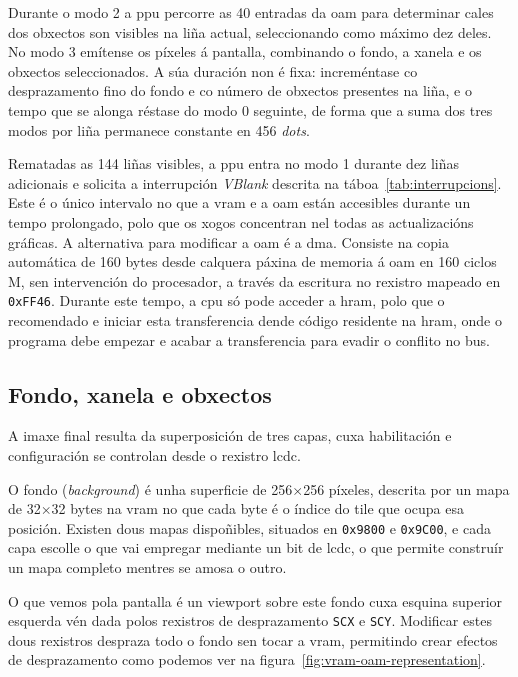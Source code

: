 Durante o modo 2 a \acrshort{ppu} percorre as 40 entradas da \acrshort{oam} para determinar
cales dos obxectos son visibles na liña actual, seleccionando como máximo dez deles.
No modo 3 emítense os píxeles á pantalla, combinando o fondo, a xanela e os obxectos
seleccionados. A súa duración non é fixa: increméntase co desprazamento fino do
fondo e co número de obxectos presentes na liña, e o tempo que se alonga réstase do modo 0
seguinte, de forma que a suma dos tres modos por liña permanece constante en 456 \textit{dots}.

Rematadas as 144 liñas visibles, a \acrshort{ppu} entra no modo 1 durante dez liñas
adicionais e solicita a interrupción \textit{VBlank} descrita na
táboa~\ref{tab:interrupcions}. Este é o único intervalo no que a \acrshort{vram} e a
\acrshort{oam} están accesibles durante un tempo prolongado, polo que os xogos concentran
nel todas as actualizacións gráficas.
A alternativa para modificar a \acrshort{oam} é a \acrfull{dma}.
Consiste na copia automática de 160 bytes desde calquera páxina de memoria
á \acrshort{oam} en 160 ciclos M, sen intervención do procesador, a través da escritura
no rexistro mapeado en \texttt{0xFF46}. Durante este tempo, a \acrshort{cpu} só pode
acceder a \acrshort{hram}, polo que o recomendado e iniciar esta transferencia dende
código residente na \acrshort{hram}, onde o programa debe empezar e acabar a transferencia para evadir
o conflito no bus.

\subsection{Fondo, xanela e obxectos}
\label{subsec:ppu-capas}

A imaxe final resulta da superposición de tres capas, cuxa habilitación e configuración
se controlan desde o rexistro \acrfull{lcdc}.

O fondo (\textit{background}) é unha superficie de 256$\times$256 píxeles, descrita
por un mapa de 32$\times$32 bytes na \acrshort{vram} no que cada byte é o índice do
\gls{tile} que ocupa esa posición. Existen dous mapas dispoñibles, situados en
\texttt{0x9800} e \texttt{0x9C00}, e cada capa escolle o que vai empregar mediante un bit
de \acrshort{lcdc}, o que permite construír un mapa completo mentres se amosa o outro.

O que vemos pola pantalla é un \gls{viewport} sobre este fondo
cuxa esquina superior esquerda vén dada polos rexistros de desprazamento \texttt{SCX} e \texttt{SCY}.
Modificar estes dous rexistros despraza todo o fondo sen tocar
a \acrshort{vram}, permitindo crear efectos de desprazamento como podemos ver
na figura~\ref{fig:vram-oam-representation}. 


